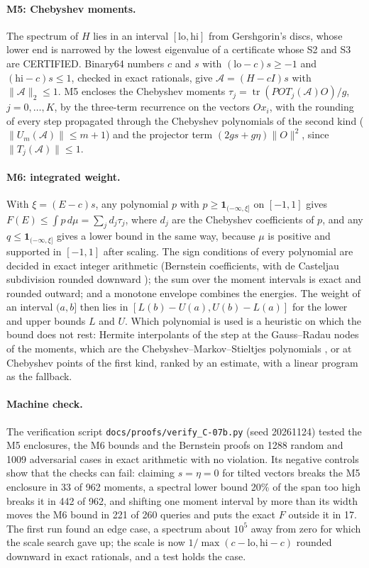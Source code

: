 \documentclass[11pt,a4paper]{article}
\newcommand{\code}[1]{\texttt{#1}}
\newcommand{\status}[1]{\textsf{#1}}
\newcommand{\CERT}{\status{CERTIFIED}}
\newcommand{\norm}[1]{\lVert #1\rVert}
\newcommand{\tr}{\operatorname{tr}}
\begin{document}
\paragraph{M5: Chebyshev moments.}
The spectrum of $H$ lies in an interval $[\mathrm{lo},\mathrm{hi}]$ from Gershgorin's discs, whose lower end is
narrowed by the lowest eigenvalue of a certificate whose S2 and S3 are \CERT. Binary64 numbers $c$ and $s$ with
$(\mathrm{lo}-c)s\ge-1$ and $(\mathrm{hi}-c)s\le1$, checked in exact rationals, give $\mathcal A=(H-cI)s$ with
$\norm{\mathcal A}_2\le1$. M5 encloses the Chebyshev moments $\tau_j=\tr(POT_j(\mathcal A)O)/g$, $j=0,\dots,K$, by the
three-term recurrence on the vectors $Ox_i$, with the rounding of every step propagated through the Chebyshev
polynomials of the second kind ($\norm{U_m(\mathcal A)}\le m+1$) and the projector term $(2gs+g\eta)\norm{O}^2$, since
$\norm{T_j(\mathcal A)}\le1$.

\paragraph{M6: integrated weight.}
With $\xi=(E-c)s$, any polynomial $p$ with $p\ge\mathbf 1_{(-\infty,\xi]}$ on $[-1,1]$ gives
$F(E)\le\int p\,d\mu=\sum_jd_j\tau_j$, where $d_j$ are the Chebyshev coefficients of $p$, and any $q\le\mathbf
1_{(-\infty,\xi]}$ gives a lower bound in the same way, because $\mu$ is positive and supported in $[-1,1]$ after
scaling. The sign conditions of every polynomial are decided in exact integer arithmetic (Bernstein coefficients, with
de Casteljau subdivision rounded downward \cite{Farouki2012}); the sum over the moment intervals is exact and rounded
outward; and a monotone envelope combines the energies. The weight of an interval $(a,b]$ then lies in
$[L(b)-U(a),U(b)-L(a)]$ for the lower and upper bounds $L$ and $U$. Which polynomial is used is a heuristic on which
the bound does not rest: Hermite interpolants of the step at the Gauss--Radau nodes of the moments, which are the
Chebyshev--Markov--Stieltjes polynomials \cite{Akhiezer1965}, or at Chebyshev points of the first kind, ranked by an
estimate, with a linear program as the fallback.

\paragraph{Machine check.}
The verification script \code{docs/proofs/verify\_C-07b.py} (seed 20261124) tested the M5 enclosures, the M6 bounds and
the Bernstein proofs on 1288 random and 1009 adversarial cases in exact arithmetic with no violation. Its negative
controls show that the checks can fail: claiming $s=\eta=0$ for tilted vectors breaks the M5 enclosure in 33 of 962
moments, a spectral lower bound 20\% of the span too high breaks it in 442 of 962, and shifting one moment interval by
more than its width moves the M6 bound in 221 of 260 queries and puts the exact $F$ outside it in 17. The first run
found an edge case, a spectrum about $10^5$ away from zero for which the scale search gave up; the scale is now
$1/\max(c-\mathrm{lo},\mathrm{hi}-c)$ rounded downward in exact rationals, and a test holds the case.
\end{document}
